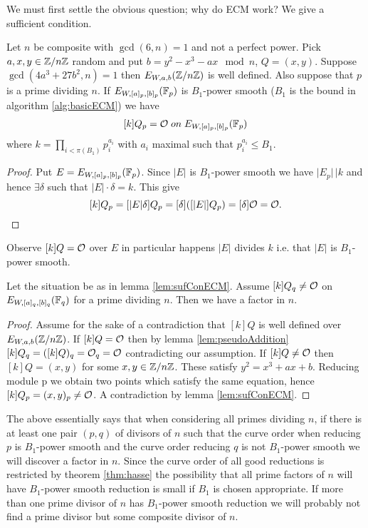 We must first settle the obvious question; why do ECM work? We give a sufficient condition.
\begin{lem}\label{lem:sufConECM}
	Let $n$ be composite with $\gcd(6,n)=1$ and not a perfect power. Pick $a,x,y\in\mathbb{Z}/n\mathbb{Z}$ random and put $b=y^2-x^3-ax\mod n$, $Q=(x,y)$. Suppose $\gcd(4a^3+27b^2,n)=1$ then $E_{W,a,b}(\mathbb{Z}/n\mathbb{Z})$ is well defined. Also suppose that  $p$ is a prime dividing $n$. If $E_{W,[a]_p,[b]_p}(\mathbb{F}_p)$ is $B_1$-power smooth ($B_1$ is the bound in algorithm \ref{alg:basicECM}) we have
\begin{align}\label{event:sufConECM}
	[k]Q_p=\mathcal{O}\; on\; E_{W,[a]_p,[b]_p}(\mathbb{F}_p)
\end{align}
where $k=\prod_{i<\pi(B_1)} p_i^{a_i}$ with $a_i$ maximal such that $p_i^{a_i}\leq B_1$. 
\end{lem}
\begin{proof}
Put $E=E_{W,[a]_p,[b]_p}(\mathbb{F}_p)$. Since $\vert E\vert$ is $B_1$-power smooth we have $\vert E_p\vert\, \vert k$ and hence $\exists \delta$ such that $\vert E\vert\cdot \delta = k$. This give
\[
	[k]Q_p=[\vert E\vert\delta]Q_p=[\delta]([\vert E\vert]Q_p)=[\delta]\mathcal{O}=\mathcal{O}.
\]
\end{proof}
Observe $[k]Q=\mathcal{O}$ over $E$ in particular happens $\vert E\vert$ divides $k$ i.e. that $\vert E\vert$ is $B_1$-power smooth.
\begin{pre}\label{prop:conFactor}
Let the situation be as in lemma \ref{lem:sufConECM}.  Assume $[k]Q_q\neq\mathcal{O}$ on $E_{W,[a]_q,[b]_q}(\mathbb{F}_q)$ for a prime dividing $n$. Then we have a factor in $n$. 
\end{pre}
\begin{proof}
Assume for the sake of a contradiction that $[k]Q$ is well defined over $E_{W,a,b}(\mathbb{Z}/n\mathbb{Z})$. If $[k]Q=\mathcal{O}$ then by lemma \ref{lem:pseudoAddition} $[k]Q_q=([k]Q)_q=\mathcal{O}_q=\mathcal{O}$ contradicting our assumption. If $[k]Q\neq \mathcal{O}$ then $[k]Q=(x,y)$ for some $x,y\in\mathbb{Z}/n\mathbb{Z}$. These satisfy $y^2=x^3+ax+b$. Reducing
module p we obtain two points which satisfy the same equation, hence $[k]Q_p=(x,y)_p\neq\mathcal{O}$. A contradiction by lemma \ref{lem:sufConECM}.
\end{proof}
The above essentially says that when considering all primes dividing $n$, if there is at least one pair $(p,q)$ of divisors of $n$ such that the curve order when reducing $p$ is $B_1$-power smooth and the curve order reducing $q$ is not $B_1$-power smooth we will discover a factor in $n$. Since the curve order of all good reductions is restricted by theorem \ref{thm:hasse} the possibility that all prime factors of $n$ will have $B_1$-power smooth reduction is small if $B_1$ is chosen appropriate. If more than one prime divisor of $n$ has $B_1$-power smooth reduction we will probably not find a prime divisor but some composite divisor of $n$. 

